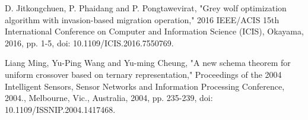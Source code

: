 \documentclass[conference]{IEEEtran}
\begin{document}
\begin{thebibliography}{00}
 D. Jitkongchuen, P. Phaidang and P. Pongtawevirat, "Grey wolf optimization algorithm with invasion-based migration operation," 2016 IEEE/ACIS 15th International Conference on Computer and Information Science (ICIS), Okayama, 2016, pp. 1-5, doi: 10.1109/ICIS.2016.7550769.

 Liang Ming, Yu-Ping Wang and Yu-ming Cheung, "A new schema theorem for uniform crossover based on ternary representation," Proceedings of the 2004 Intelligent Sensors, Sensor Networks and Information Processing Conference, 2004., Melbourne, Vic., Australia, 2004, pp. 235-239, doi: 10.1109/ISSNIP.2004.1417468.
\end{thebibliography}
\end{document}
